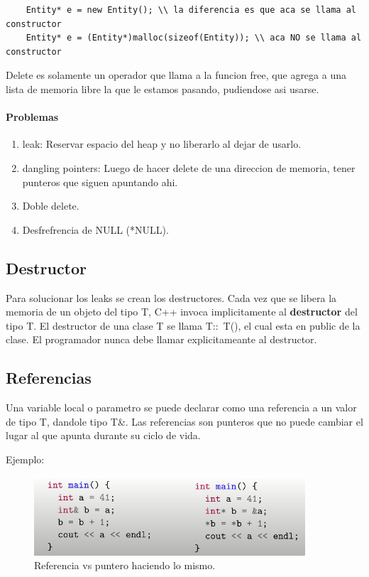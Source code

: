 \documentclass[11pt]{article}
\begin{document}
\begin{lstlisting}
    Entity* e = new Entity(); \\ la diferencia es que aca se llama al constructor
    Entity* e = (Entity*)malloc(sizeof(Entity)); \\ aca NO se llama al constructor
\end{lstlisting}

Delete es solamente un operador que llama a la funcion free, que agrega a una lista
de memoria libre la que le estamos pasando, pudiendose asi usarse.

\paragraph{Problemas}
\begin{enumerate}
    \item leak: Reservar espacio del heap y no liberarlo al dejar de usarlo.
    \item dangling pointers: Luego de hacer delete de una direccion de memoria, tener
        punteros que siguen apuntando ahi.
    \item Doble delete.
    \item Desfrefrencia de NULL (*NULL).
\end{enumerate}

\subsection{Destructor}
Para solucionar los leaks se crean los destructores.
Cada vez que se libera la memoria de un objeto del tipo T, C++ invoca implicitamente
al \textbf{destructor} del tipo T.
El destructor de una clase T se llama T::~T(), el cual esta en public de la clase.
El programador nunca debe llamar explicitameante al destructor.

\subsection{Referencias}
Una variable local o parametro se puede declarar como una referencia a un valor de
tipo T, dandole tipo T\&.
Las referencias son punteros que no puede cambiar el lugar al que apunta
durante su ciclo de vida.

Ejemplo:
\begin{figure}[h]
    \centering
    \includegraphics[width=0.9\textwidth]{referencia.png}
    \caption{Referencia vs puntero  haciendo lo mismo.}
    \label{fig:ref}
\end{figure}
\end{document}
